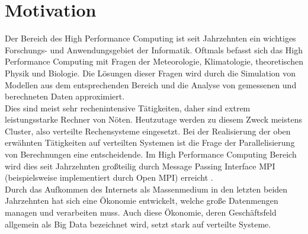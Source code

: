 \documentclass[
	12pt,
	a4paper,
	BCOR10mm,
	DIV14,
	listof=totoc,
	bibliography=totoc,
	headsepline
]{scrreprt}
\begin{document}
\section{Motivation}
Der Bereich des High Performance Computing ist seit Jahrzehnten ein wichtiges Forschungs- und Anwendungsgebiet der Informatik.
Oftmals befasst sich das High Performance Computing mit Fragen der Meteorologie, Klimatologie, theoretischen Physik und Biologie.
Die Lösungen dieser Fragen wird durch die Simulation von Modellen aus dem entsprechenden Bereich und die Analyse von gemessenen und berechneten Daten approximiert. \\
Dies sind meist sehr rechenintensive Tätigkeiten, daher sind extrem leistungsstarke Rechner von Nöten.
Heutzutage werden zu diesem Zweck meistens Cluster, also verteilte Rechensysteme eingesetzt.
Bei der Realisierung der oben erwähnten Tätigkeiten auf verteilten Systemen ist die Frage der Parallelisierung von Berechnungen eine entscheidende. 
Im High Performance Computing Bereich wird dies seit Jahrzehnten großteilig durch Message Passing Interface MPI (beispielsweise implementiert durch Open MPI) erreicht \cite{HLR}. \\
Durch das Aufkommen des Internets als Massenmedium in den letzten beiden Jahrzehnten hat sich eine Ökonomie entwickelt, welche große Datenmengen managen und verarbeiten muss.
Auch diese Ökonomie, deren Geschäftsfeld allgemein als Big Data bezeichnet wird, setzt stark auf verteilte Systeme.
\end{document}
